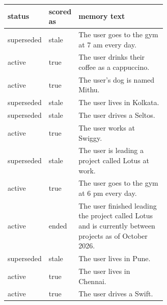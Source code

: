 \begin{tabular}{llp{0.62\linewidth}}
\toprule
status & scored as & memory text \\
\midrule
superseded & stale & The user goes to the gym at 7 am every day. \\
active & true & The user drinks their coffee as a cappuccino. \\
active & true & The user's dog is named Mithu. \\
superseded & stale & The user lives in Kolkata. \\
superseded & stale & The user drives a Seltos. \\
active & true & The user works at Swiggy. \\
superseded & stale & The user is leading a project called Lotus at work. \\
active & true & The user goes to the gym at 6 pm every day. \\
active & ended & The user finished leading the project called Lotus and is currently between projects as of October 2026. \\
superseded & stale & The user lives in Pune. \\
active & true & The user lives in Chennai. \\
active & true & The user drives a Swift. \\
\bottomrule
\end{tabular}
